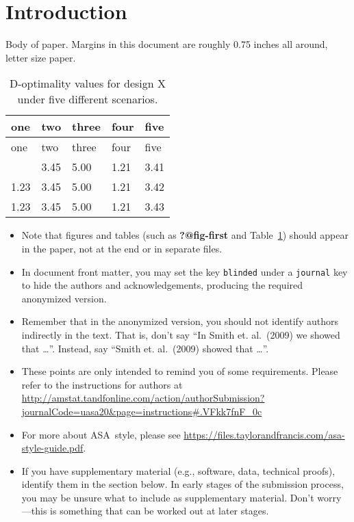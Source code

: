 \documentclass[
  12pt]{article}
\providecommand{\tightlist}{%
  \setlength{\itemsep}{0pt}\setlength{\parskip}{0pt}}\usepackage{longtable,booktabs,array}
\begin{document}
\section{Introduction}\label{sec-intro}

Body of paper. Margins in this document are roughly 0.75 inches all
around, letter size paper.

\begin{longtable}[]{@{}lllll@{}}
\caption{D-optimality values for design X under five different
scenarios.}\label{tbl-one}\tabularnewline
\toprule\noalign{}
one & two & three & four & five \\
\midrule\noalign{}
\endfirsthead
\toprule\noalign{}
one & two & three & four & five \\
\midrule\noalign{}
\endhead
\bottomrule\noalign{}
\endlastfoot
1.23 & 3.45 & 5.00 & 1.21 & 3.41 \\
1.23 & 3.45 & 5.00 & 1.21 & 3.42 \\
1.23 & 3.45 & 5.00 & 1.21 & 3.43 \\
\end{longtable}

\begin{itemize}
\tightlist
\item
  Note that figures and tables (such as \textbf{?@fig-first} and
  Table~\ref{tbl-one}) should appear in the paper, not at the end or in
  separate files.
\item
  In document front matter, you may set the key \texttt{blinded} under a
  \texttt{journal} key to hide the authors and acknowledgements,
  producing the required anonymized version.
\item
  Remember that in the anonymized version, you should not identify
  authors indirectly in the text. That is, don't say ``In Smith et.
  al.~(2009) we showed that \ldots{}''. Instead, say ``Smith et.
  al.~(2009) showed that \ldots{}''.
\item
  These points are only intended to remind you of some requirements.
  Please refer to the instructions for authors at
  \url{http://amstat.tandfonline.com/action/authorSubmission?journalCode=uasa20&page=instructions\#.VFkk7fnF_0c}
\item
  For more about ASA~style, please see
  \url{https://files.taylorandfrancis.com/asa-style-guide.pdf}.
\item
  If you have supplementary material (e.g., software, data, technical
  proofs), identify them in the section below. In early stages of the
  submission process, you may be unsure what to include as supplementary
  material. Don't worry---this is something that can be worked out at
  later stages.
\end{itemize}
\end{document}

